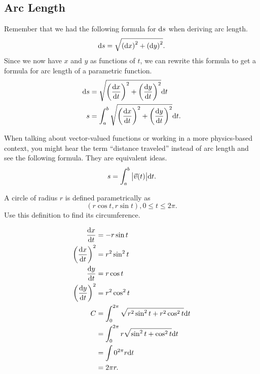 \subsection{Arc Length}
Remember that we had the following formula for $\mathrm{d} s$ when deriving arc length.
\begin{equation*}
	\mathrm{d} s = \sqrt{\left(\mathrm{d} x\right)^2 + \left(\mathrm{d} y\right)^2}.
\end{equation*}
Since we now have $x$ and $y$ as functions of $t$, we can rewrite this formula to get a formula for arc length of a parametric function.
\begin{align*}
	\mathrm{d} s &= \sqrt{\left(\frac{\mathrm{d} x}{\mathrm{d} t}\right)^2 + \left(\frac{\mathrm{d} y}{\mathrm{d} t}\right)^2}\mathrm{d} t \\
	s &= \int_{a}^{b}{\sqrt{\left(\frac{\mathrm{d} x}{\mathrm{d} t}\right)^2 + \left(\frac{\mathrm{d} y}{\mathrm{d} t}\right)^2}\mathrm{d} t}.
\end{align*}

When talking about vector-valued functions or working in a more physics-based context, you might hear the term ``distance traveled'' instead of arc length and see the following formula.
They are equivalent ideas.
\begin{equation*}
	s = \int_{a}^{b}{\big\lvert \vec{v}(t) \big\rvert\mathrm{d} t}.
\end{equation*}

\begin{example}
	A circle of radius $r$ is defined parametrically as
	\begin{equation*}
		(r\cos{t}, r\sin{t}), 0 \leq t \leq 2\pi.
	\end{equation*}
	Use this definition to find its circumference.
\end{example}
\begin{answer}
	\begin{align*}
		\frac{\mathrm{d} x}{\mathrm{d} t} &= -r\sin{t} \\
		\left(\frac{\mathrm{d} x}{\mathrm{d} t}\right)^2 &= r^2\sin^2{t} \\
		\frac{\mathrm{d} y}{\mathrm{d} t} &= r\cos{t} \\
		\left(\frac{\mathrm{d} y}{\mathrm{d} t}\right)^2 &= r^2\cos^2{t} \\
		C &= \int_{0}^{2\pi}{\sqrt{r^2\sin^2{t}+r^2\cos^2{t}}\mathrm{d} t} \\
		&= \int_{0}^{2\pi}{r\sqrt{\sin^2{t}+\cos^2{t}}\mathrm{d} t} \\
		&= \int{0}^{2\pi}{r\mathrm{d} t} \\
		&= 2\pi r.
	\end{align*}
\end{answer}